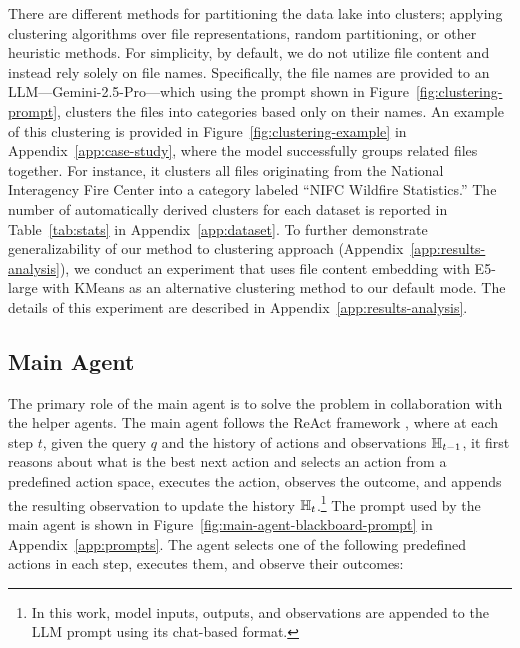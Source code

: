 There are different methods for partitioning the data lake into clusters; applying clustering algorithms over file representations, random partitioning, or other heuristic methods. For simplicity, by default, we do not utilize file content and instead rely solely on file names. Specifically, the file names are provided to an LLM---Gemini-2.5-Pro---which using the prompt shown in Figure~\ref{fig:clustering-prompt}, clusters the files into categories based only on their names. An example of this clustering is provided in Figure~\ref{fig:clustering-example} in Appendix~\ref{app:case-study}, where the model successfully groups related files together. For instance, it clusters all files originating from the National Interagency Fire Center into a category labeled ``NIFC Wildfire Statistics.'' The number of automatically derived clusters for each dataset is reported in Table~\ref{tab:stats} in Appendix~\ref{app:dataset}. To further demonstrate generalizability of our method to clustering approach (Appendix~\ref{app:results-analysis}), we conduct an experiment that uses file content embedding with E5-large \cite{wang2022text} with KMeans as an alternative clustering method to our default mode. The details of this experiment are described in Appendix~\ref{app:results-analysis}.




\subsection{Main Agent}
\label{sec:main-agent}

The primary role of the main agent is to solve the problem in collaboration with the helper agents. The main agent follows the ReAct framework \citep{yao2023react}, where at each step $t$, given the query $q$ and the history of actions and observations ${\mathbb{H}}_{t-1}$, it first reasons about what is the best next action and selects an action from a predefined action space, executes the action, observes the outcome, and appends the resulting observation to update the history ${\mathbb{H}}_{t}$.\footnote{In this work, model inputs, outputs, and observations are appended to the LLM prompt using its chat-based format.} The prompt used by the main agent is shown in Figure~\ref{fig:main-agent-blackboard-prompt} in Appendix~\ref{app:prompts}. The agent selects one of the following predefined actions in each step, executes them, and observe their outcomes:

